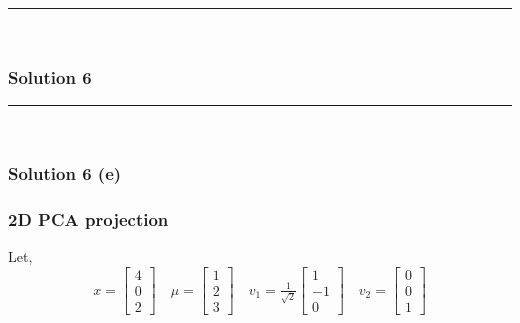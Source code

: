 \documentclass{article}
\begin{document}
{\noindent\rule{\textwidth}{0.4pt}\\

\newpage

\subsubsection*{Solution 6}
\noindent\rule{\textwidth}{0.4pt}\\
\subsubsection*{Solution 6 (e)}
\subsubsection*{2D PCA projection}
Let, \\
$$x=\begin{bmatrix}4 \\ 0 \\ 2\end{bmatrix} \quad \mu = \begin{bmatrix}1 \\ 2 \\ 3\end{bmatrix} \quad v_1=\tfrac{1}{\sqrt{2}}\begin{bmatrix}1 \\ -1 \\ 0\end{bmatrix} \quad v_2=\begin{bmatrix}0 \\ 0 \\ 1\end{bmatrix}$$ \\

}
\end{document}
